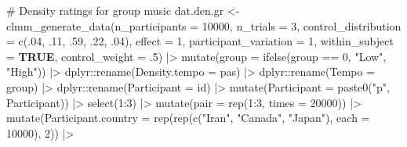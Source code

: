 \documentclass[
  bookmarksnumbered]{article}
\newenvironment{Shaded}{\begin{snugshade}}{\end{snugshade}}
\newcommand{\AttributeTok}[1]{\textcolor[rgb]{0.80,0.80,0.80}{#1}}
\newcommand{\CommentTok}[1]{\textcolor[rgb]{0.50,0.62,0.50}{#1}}
\newcommand{\ConstantTok}[1]{\textcolor[rgb]{0.86,0.64,0.64}{\textbf{#1}}}
\newcommand{\DecValTok}[1]{\textcolor[rgb]{0.86,0.86,0.80}{#1}}
\newcommand{\FunctionTok}[1]{\textcolor[rgb]{0.94,0.94,0.56}{#1}}
\newcommand{\NormalTok}[1]{\textcolor[rgb]{0.80,0.80,0.80}{#1}}
\newcommand{\OtherTok}[1]{\textcolor[rgb]{0.94,0.94,0.56}{#1}}
\newcommand{\SpecialCharTok}[1]{\textcolor[rgb]{0.86,0.64,0.64}{#1}}
\newcommand{\StringTok}[1]{\textcolor[rgb]{0.80,0.58,0.58}{#1}}
\begin{document}
\begin{Shaded}
\begin{Highlighting}[]
\CommentTok{\# Density ratings for group music}
\NormalTok{dat.den.gr }\OtherTok{\textless{}{-}} \FunctionTok{clmm\_generate\_data}\NormalTok{(}\AttributeTok{n\_participants =} \DecValTok{10000}\NormalTok{,}
                                 \AttributeTok{n\_trials =} \DecValTok{3}\NormalTok{,}
                                 \AttributeTok{control\_distribution =} \FunctionTok{c}\NormalTok{(.}\DecValTok{04}\NormalTok{, .}\DecValTok{11}\NormalTok{, .}\DecValTok{59}\NormalTok{, .}\DecValTok{22}\NormalTok{, .}\DecValTok{04}\NormalTok{),}
                                 \AttributeTok{effect =} \DecValTok{1}\NormalTok{,}
                                 \AttributeTok{participant\_variation =} \DecValTok{1}\NormalTok{,}
                                 \AttributeTok{within\_subject =} \ConstantTok{TRUE}\NormalTok{,}
                                 \AttributeTok{control\_weight =}\NormalTok{ .}\DecValTok{5}\NormalTok{) }\SpecialCharTok{|\textgreater{}}
  \FunctionTok{mutate}\NormalTok{(}\AttributeTok{group =} \FunctionTok{ifelse}\NormalTok{(group }\SpecialCharTok{==} \DecValTok{0}\NormalTok{, }\StringTok{"Low"}\NormalTok{, }\StringTok{"High"}\NormalTok{)) }\SpecialCharTok{|\textgreater{}}
\NormalTok{  dplyr}\SpecialCharTok{::}\FunctionTok{rename}\NormalTok{(}\AttributeTok{Density.tempo =}\NormalTok{ pas) }\SpecialCharTok{|\textgreater{}}
\NormalTok{  dplyr}\SpecialCharTok{::}\FunctionTok{rename}\NormalTok{(}\AttributeTok{Tempo =}\NormalTok{ group) }\SpecialCharTok{|\textgreater{}}
\NormalTok{  dplyr}\SpecialCharTok{::}\FunctionTok{rename}\NormalTok{(}\AttributeTok{Participant =}\NormalTok{ id) }\SpecialCharTok{|\textgreater{}}
  \FunctionTok{mutate}\NormalTok{(}\AttributeTok{Participant =} \FunctionTok{paste0}\NormalTok{(}\StringTok{"p"}\NormalTok{, Participant)) }\SpecialCharTok{|\textgreater{}}
  \FunctionTok{select}\NormalTok{(}\DecValTok{1}\SpecialCharTok{:}\DecValTok{3}\NormalTok{) }\SpecialCharTok{|\textgreater{}}
  \FunctionTok{mutate}\NormalTok{(}\AttributeTok{pair =} \FunctionTok{rep}\NormalTok{(}\DecValTok{1}\SpecialCharTok{:}\DecValTok{3}\NormalTok{, }\AttributeTok{times =} \DecValTok{20000}\NormalTok{)) }\SpecialCharTok{|\textgreater{}}
  \FunctionTok{mutate}\NormalTok{(}\AttributeTok{Participant.country =} \FunctionTok{rep}\NormalTok{(}\FunctionTok{rep}\NormalTok{(}\FunctionTok{c}\NormalTok{(}\StringTok{"Iran"}\NormalTok{, }\StringTok{"Canada"}\NormalTok{, }\StringTok{"Japan"}\NormalTok{), }\AttributeTok{each =} \DecValTok{10000}\NormalTok{), }\DecValTok{2}\NormalTok{)) }\SpecialCharTok{|\textgreater{}}

\end{Highlighting}
\end{Shaded}
\end{document}
